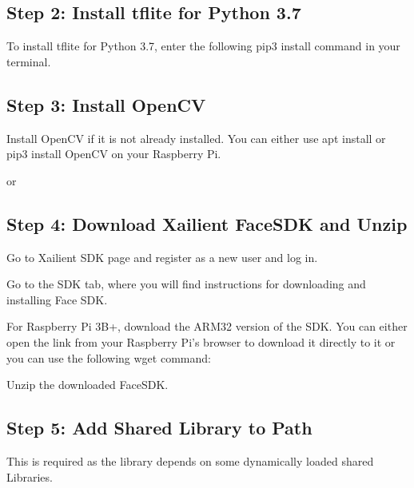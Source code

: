     
\subsection{Step 2: Install tflite for Python 3.7}

To install tflite for Python 3.7, enter the following pip3 install command in your terminal.
    

\subsection{Step 3: Install OpenCV}

    Install OpenCV if it is not already installed. You can either use apt install or pip3 install OpenCV on your Raspberry Pi.
    
    
    or
    
    
    
    
\subsection{Step 4: Download Xailient FaceSDK and Unzip}

    Go to Xailient SDK page and register as a new user and log in.
    
    Go to the SDK tab, where you will find instructions for downloading and installing Face SDK.
    
    
    For Raspberry Pi 3B+, download the ARM32 version of the SDK. You can either open the link from your Raspberry Pi’s browser to download it directly to it or you can use the following wget command:
    


    
    Unzip the downloaded FaceSDK.
    
\subsection{Step 5: Add Shared Library to Path}


This is required as the library depends on some dynamically loaded shared Libraries.
    
